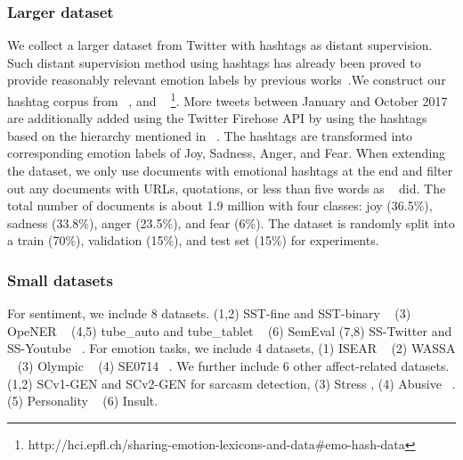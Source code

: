 \documentclass[11pt,a4paper]{article}
\begin{document}
\subsubsection*{Larger dataset} We collect a larger dataset from Twitter with hashtags as distant supervision. Such distant supervision method using hashtags has already been proved to provide reasonably relevant emotion labels by previous works~\cite{Wang2012}.We construct our hashtag corpus from ~,  and ~ \footnote{http://hci.epfl.ch/sharing-emotion-lexicons-and-data\#emo-hash-data}. More tweets between January and October 2017 are additionally added using the Twitter Firehose API by using the hashtags based on the hierarchy mentioned in ~. The hashtags are transformed into corresponding emotion labels of Joy, Sadness, Anger, and Fear.  When extending the dataset, we only use documents with emotional hashtags at the end and filter out any documents with URLs, quotations, or less than five words as ~ did. The total number of documents is about 1.9 million with four classes: joy (36.5\%), sadness (33.8\%), anger (23.5\%), and fear (6\%). The dataset is randomly split into a train (70\%), validation (15\%), and test set  (15\%) for experiments. 

  
\subsubsection*{Small datasets}
For sentiment, we include 8 datasets. (1,2) SST-fine and SST-binary ~\cite{socher2013recursive} (3) OpeNER ~\cite{agerri2013opener} (4,5) tube\_auto and tube\_tablet ~\cite{uryupina2014sentube}  (6) SemEval \cite{hltcoe2013semeval} (7,8) SS-Twitter and SS-Youtube ~\cite{Thelwall2010}. For emotion tasks, we include 4 datasets, (1) ISEAR ~\cite{Wallbott1986} (2) WASSA ~\cite{Mohammad2017} (3) Olympic ~ (4) SE0714 ~\cite{staiano2014depechemood}. We further include 6 other affect-related datasets. (1,2) SCv1-GEN and SCv2-GEN for sarcasm detection, (3) Stress \cite{winata2018attention},  (4) Abusive ~\cite{waseem2016you,waseem2016hateful}. (5) Personality ~\cite{pennebaker1999linguistic} (6) Insult. 
\end{document}
